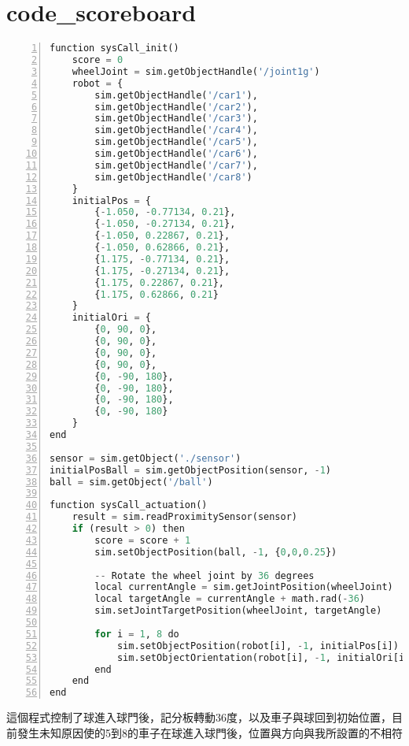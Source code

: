 \section{code\_scoreboard}
\begin{lstlisting}[language=Python, frame=single, numbers=left, captionpos=b, basicstyle=\ttfamily\small, showstringspaces=false, breaklines=true, tabsize=4, xleftmargin=15pt]
function sysCall_init()
    score = 0
    wheelJoint = sim.getObjectHandle('/joint1g')
    robot = {
        sim.getObjectHandle('/car1'),
        sim.getObjectHandle('/car2'),
        sim.getObjectHandle('/car3'),
        sim.getObjectHandle('/car4'),
        sim.getObjectHandle('/car5'),
        sim.getObjectHandle('/car6'),
        sim.getObjectHandle('/car7'),
        sim.getObjectHandle('/car8')
    }
    initialPos = {
        {-1.050, -0.77134, 0.21},
        {-1.050, -0.27134, 0.21},
        {-1.050, 0.22867, 0.21},
        {-1.050, 0.62866, 0.21},
        {1.175, -0.77134, 0.21},
        {1.175, -0.27134, 0.21},
        {1.175, 0.22867, 0.21},
        {1.175, 0.62866, 0.21}
    }
    initialOri = {
        {0, 90, 0},
        {0, 90, 0},
        {0, 90, 0},
        {0, 90, 0},
        {0, -90, 180},
        {0, -90, 180},
        {0, -90, 180},
        {0, -90, 180}
    }
end
 
sensor = sim.getObject('./sensor')
initialPosBall = sim.getObjectPosition(sensor, -1)
ball = sim.getObject('/ball')
 
function sysCall_actuation()
    result = sim.readProximitySensor(sensor)
    if (result > 0) then
        score = score + 1
        sim.setObjectPosition(ball, -1, {0,0,0.25})
         
        -- Rotate the wheel joint by 36 degrees
        local currentAngle = sim.getJointPosition(wheelJoint)
        local targetAngle = currentAngle + math.rad(-36)
        sim.setJointTargetPosition(wheelJoint, targetAngle)
         
        for i = 1, 8 do
            sim.setObjectPosition(robot[i], -1, initialPos[i])
            sim.setObjectOrientation(robot[i], -1, initialOri[i])
        end
    end
end
\end{lstlisting}
這個程式控制了球進入球門後，記分板轉動36度，以及車子與球回到初始位置，目前發生未知原因使的5到8的車子在球進入球門後，位置與方向與我所設置的不相符\\